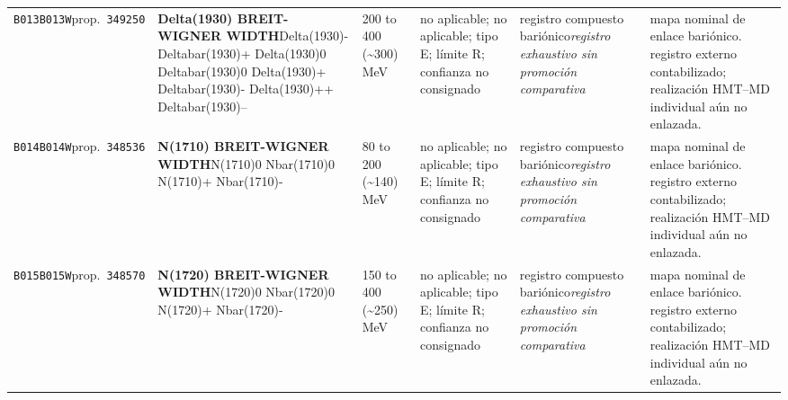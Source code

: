 \begin{landscape}
\begin{longtable}{L{1.85cm}L{4.45cm}L{2.35cm}L{4.05cm}L{3.35cm}L{7.15cm}}
\texttt{B013}\newline \texttt{B013W}\newline prop.\ \texttt{349250} & \textbf{Delta(1930) BREIT-WIGNER WIDTH}\newline Delta(1930)- \textbar{}\allowbreak{} Deltabar(1930)+ \textbar{}\allowbreak{} Delta(1930)0 \textbar{}\allowbreak{} Deltabar(1930)0 \textbar{}\allowbreak{} Delta(1930)+ \textbar{}\allowbreak{} Deltabar(1930)- \textbar{}\allowbreak{} Delta(1930)++ \textbar{}\allowbreak{} Deltabar(1930)-- & 200 to 400 (\textasciitilde{}300)\,MeV & no aplicable; no aplicable; tipo E; límite R; confianza no consignado & registro compuesto bariónico\newline \emph{registro exhaustivo sin promoción comparativa} & mapa nominal de enlace bariónico. registro externo contabilizado; realización HMT--MD individual aún no enlazada. \\
\texttt{B014}\newline \texttt{B014W}\newline prop.\ \texttt{348536} & \textbf{N(1710) BREIT-WIGNER WIDTH}\newline N(1710)0 \textbar{}\allowbreak{} Nbar(1710)0 \textbar{}\allowbreak{} N(1710)+ \textbar{}\allowbreak{} Nbar(1710)- & 80 to 200 (\textasciitilde{}140)\,MeV & no aplicable; no aplicable; tipo E; límite R; confianza no consignado & registro compuesto bariónico\newline \emph{registro exhaustivo sin promoción comparativa} & mapa nominal de enlace bariónico. registro externo contabilizado; realización HMT--MD individual aún no enlazada. \\
\texttt{B015}\newline \texttt{B015W}\newline prop.\ \texttt{348570} & \textbf{N(1720) BREIT-WIGNER WIDTH}\newline N(1720)0 \textbar{}\allowbreak{} Nbar(1720)0 \textbar{}\allowbreak{} N(1720)+ \textbar{}\allowbreak{} Nbar(1720)- & 150 to 400 (\textasciitilde{}250)\,MeV & no aplicable; no aplicable; tipo E; límite R; confianza no consignado & registro compuesto bariónico\newline \emph{registro exhaustivo sin promoción comparativa} & mapa nominal de enlace bariónico. registro externo contabilizado; realización HMT--MD individual aún no enlazada. \\

\end{longtable}
\end{landscape}
